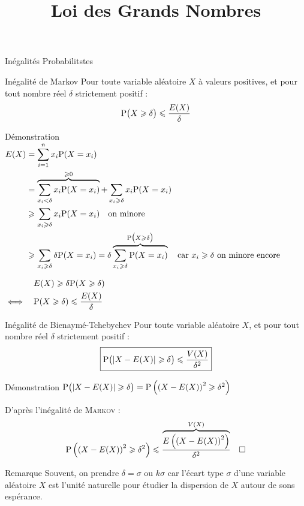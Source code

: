\documentclass{cours}
\title{Loi des Grands Nombres}
\begin{document}

    \begin{Gpartie}{Inégalités Probabilitstes} 
        \begin{Spartie}{Inégalité de Markov} 
            Pour toute variable aléatoire $X$ à valeurs positives, et pour tout nombre réel $\delta$ strictement positif : \[\mathrm{P}\big(X\geqslant\delta\big)\leqslant\frac{E(X)}{\delta}\]
            \begin{SSpartie}{Démonstration} 
                $\begin{aligned}[t]
                    E(X) &= \sum_{i=1}^n x_i\mathrm{P}(X=x_i) \\
                    &= \overbrace{\sum_{x_i<\delta} x_i\mathrm{P}(X=x_i)}^{\geqslant0} + \sum_{x_i\geqslant\delta} x_i\mathrm{P}(X=x_i) \\
                    &\geqslant\sum_{x_i\geqslant\delta} x_i\mathrm{P}(X=x_i)\quad\text{on minore}\\
                    &\geqslant\sum_{x_i\geqslant\delta} \delta\mathrm{P}(X=x_i)=\delta\overbrace{\sum_{x_i\geqslant\delta}\mathrm{P}(X=x_i)}^{\mathrm{P}\big(X\geqslant\delta\big)}\quad\text{car $x_i\geqslant\delta$ on minore encore}
                \end{aligned}$

                $\begin{aligned}[t]
                    &\quad E(X)\geqslant\delta\mathrm{P}(X\geqslant\delta) \\
                    \iff&\quad \mathrm{P}(X\geqslant\delta)\leqslant\frac{E(X)}{\delta}
                \end{aligned}$
            \end{SSpartie}
        \end{Spartie}
        \pagebreak
        \begin{Spartie}{Inégalité de Bienaymé-Tchebychev} 
            Pour toute variable aléatoire $X$, et pour tout nombre réel $\delta$ strictement positif : \[\boxed{\mathrm{P}\big(\lvert X-E(X)\rvert\geqslant\delta\big)\leqslant\frac{V(X)}{\delta^2}}\]
            \begin{SSpartie}{Démonstration} 
                $\mathrm{P}\big(\lvert X-E(X)\rvert\geqslant\delta\big)=\mathrm{P}\left(\left(X-E(X)\right)^2\geqslant\delta^2\right)$

                D'après l'inégalité de \textsc{Markov} : \[\mathrm{P}\left(\left(X-E(X)\right)^2\geqslant\delta^2\right)\leqslant\frac{\overbrace{E\left(\left(X-E(X)\right)^2\right)}^{V(X)}}{\delta^2}\quad\square\]
            \end{SSpartie}
        \end{Spartie}
        \begin{Spartie}{Remarque} 
            Souvent, on prendre $\delta=\sigma$ ou $k\sigma$ car l'écart type $\sigma$ d'une variable aléatoire $X$ est l'unité naturelle pour étudier la dispersion de $X$ autour de sons espérance.


\end{Spartie}
\end{Gpartie}
\end{document}
